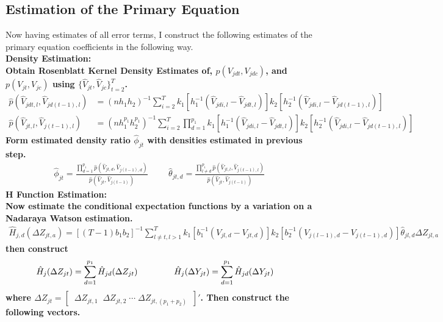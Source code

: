 \documentclass[10pt]{article}
\begin{document}
\subsection*{Estimation of the Primary Equation}
%
Now having estimates of all error terms, I construct the following estimates of the primary equation coefficients in the following way. \\
%
\noindent \bf Density Estimation: \rm  \\
%
Obtain Rosenblatt Kernel Density Estimates of, $p(V_{jdt},V_{jdc})$, and $p(V_{jt},V_{jc})$ using $\{\hat{V}_{jt}, \hat{V}_{jc}\}_{t=2}^T$.
\begin{align*}
 \hat{p}(\hat{V}_{jdt,l},\hat{V}_{jd(t-1),l})
&= (nh_1h_2)^{-1}\sum_{ i = 2 }^T k_1[h_1^{-1}(\hat{V}_{jdi,l} -\hat{V}_{jdt,l})]k_2[h_2^{-1}(\hat{V}_{jdi,l} -\hat{V}_{jd(t-1),l})]  \\
%
 \hat{p}(\hat{V}_{jt,l},\hat{V}_{j(t-1),l})
&= (nh_1^{p_1}h_2^{p_1})^{-1}\sum_{ i = 2 }^T \prod_{d=1}^{p_1} k_1[h_1^{-1}(\hat{V}_{jdi,l} -\hat{V}_{jdt,l})]k_2[h_2^{-1}(\hat{V}_{jdi,l} -\hat{V}_{jd(t-1),l})]
\end{align*}
 Form estimated density ratio $\hat{\phi}_{jt}$ with densities estimated in previous step.
\begin{align*}
\hat{\phi}_{jt} = \frac{ \prod_{d=1}^{p_1}\hat{p}(\hat{V}_{jt,d},\hat{V}_{j(t-1),d}) }{\hat{p}(\hat{V}_{jt},\hat{V}_{j(t-1)})}
%
\hspace{1cm}
%
\hat{\theta}_{jt,d} = \frac{ \prod_{l \neq d}^{p_1}\hat{p}(\hat{V}_{jt,l},\hat{V}_{j(t-1),l}) }{\hat{p}(\hat{V}_{jt},\hat{V}_{j(t-1)})}
\end{align*}
%
\noindent \bf H Function Estimation:  \rm  \\
%
Now estimate the conditional expectation functions by a variation on a Nadaraya Watson estimation.
\begin{align*}
 \hat{H}_{j,d}(\Delta Z_{jt,a}) = [(T-1)b_1b_2]^{-1} \sum_{l \neq t , l > 1}^T k_1[b_1^{-1}(V_{jl,d} - V_{jt,d})] k_2[b_2^{-1}(V_{j(l-1),d} - V_{j(t-1),d})] \hat{\theta}_{jl,d} \Delta Z_{jl,a}
 \end{align*}
then construct
    \begin{align*}
    \hat{H}_j(\Delta Z_{jt}) &= \sum_{d=1}^{p_1} \hat{H}_{jd}(\Delta Z_{jt})  \hspace{1.5cm}
%
\hat{H}_j(\Delta Y_{jt}) = \sum_{d=1}^{p_1} \hat{H}_{jd}(\Delta Y_{jt})
    \end{align*}
where $ \Delta Z_{jt}  = [ \; \; \Delta Z_{jt,1}    \;\;    \Delta Z_{jt,2}     \;   \cdots \; \Delta Z_{jt,(p_1+p_2)} \;\; ]'$. Then construct the following vectors.
\end{document}
